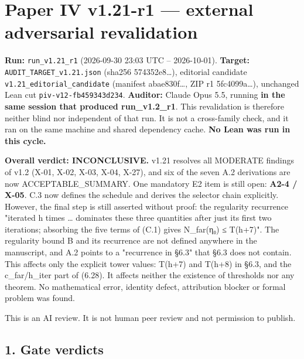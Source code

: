 \documentclass[
]{article}
\author{}
\date{}
\begin{document}
\section{Paper IV v1.21-r1 --- external adversarial
revalidation}\label{paper-iv-v121-r1--external-adversarial-revalidation}

\textbf{Run:} \texttt{run\_v1.21\_r1} (2026-09-30 23:03 UTC --
2026-10-01). \textbf{Target:} \texttt{AUDIT\_TARGET\_v1.21.json} (sha256
574352e8\ldots), editorial candidate
\texttt{v1.21\_editorial\_candidate} (manifest abae830f\ldots, ZIP r1
5fc4099a\ldots), unchanged Lean cut \texttt{piv-v12-fb459343d234}.
\textbf{Auditor:} Claude Opus 5.5, running \textbf{in the same session
that produced run\_v1.2\_r1}. This revalidation is therefore neither
blind nor independent of that run. It is not a cross-family check, and
it ran on the same machine and shared dependency cache. \textbf{No Lean
was run in this cycle.}

\textbf{Overall verdict: INCONCLUSIVE.} v1.21 resolves all MODERATE
findings of v1.2 (X-01, X-02, X-03, X-04, X-27), and six of the seven
A.2 derivations are now ACCEPTABLE\_SUMMARY. One mandatory E2 item is
still open: \textbf{A2-4 / X-05}. C.3 now defines the schedule and
derives the selector chain explicitly. However, the final step is still
asserted without proof: the regularity recurrence "iterated h times
\ldots{} dominates these three quantities after just its first two
iterations; absorbing the five terms of (C.1) gives N\_far(η₀) ≤
T(h+7)". The regularity bound B and its recurrence are not defined
anywhere in the manuscript, and A.2 points to a "recurrence in §6.3"
that §6.3 does not contain. This affects only the explicit tower values:
T(h+7) and T(h+8) in §6.3, and the c\_far/h\_iter part of (6.28). It
affects neither the existence of thresholds nor any theorem. No
mathematical error, identity defect, attribution blocker or formal
problem was found.

This is an AI review. It is not human peer review and not permission to
publish.

\subsection{1. Gate verdicts}\label{1-gate-verdicts}
\end{document}
